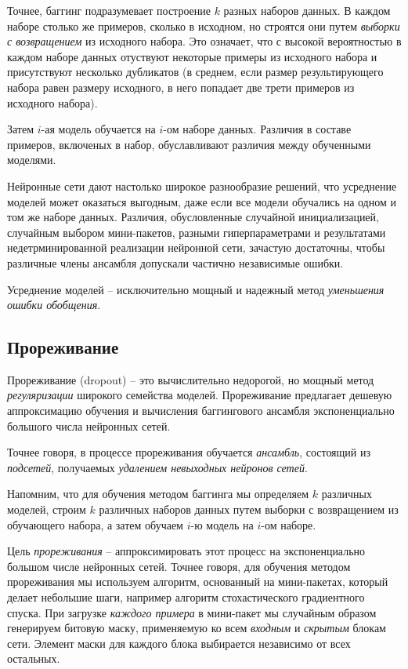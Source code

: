 \documentclass[%
	11pt,
	a4paper,
	utf8,
]{article}
\begin{document}
Точнее, баггинг подразумевает построение $ k $ разных наборов данных. В каждом наборе столько же примеров, сколько в исходном, но строятся они путем \emph{выборки с возвращением} из исходного набора. Это означает, что с высокой вероятностью в каждом наборе данных отуствуют некоторые примеры из исходного набора и присутствуют несколько дубликатов (в среднем, если размер результирующего набора равен размеру исходного, в него попадает две трети примеров из исходного набора). 

Затем $ i $-ая модель обучается на $ i $-ом наборе данных. Различия в составе примеров, включеных в набор, обуславливают различия между обученными моделями.

{\color{blue}Нейронные сети дают настолько широкое разнообразие решений, что усреднение моделей может оказаться выгодным, даже если все модели обучались на одном и том же наборе данных.} Различия, обусловленные случайной инициализацией, случайным выбором мини-пакетов, разными гиперпараметрами и результатами недетрминированной реализации нейронной сети, зачастую достаточны, чтобы различные члены ансамбля допускали частично независимые ошибки.

Усреднение моделей -- исключительно мощный и надежный метод \emph{уменьшения ошибки обобщения}.

\subsection{Прореживание}

Прореживание (dropout) -- это вычислительно недорогой, но мощный метод \emph{регуляризации} широкого семейства моделей. Прореживание предлагает дешевую аппроксимацию обучения и вычисления баггингового ансамбля экспоненциально большого числа нейронных сетей.

Точнее говоря, в процессе прореживания обучается \emph{ансамбль}, состоящий из \emph{подсетей}, получаемых \emph{удалением невыходных нейронов сетей}.

Напомним, что для обучения методом баггинга мы определяем $ k $ различных моделей, строим $ k $ различных наборов данных путем выборки с возвращением из обучающего набора, а затем обучаем $ i $-ю модель на $ i $-ом наборе.

Цель \emph{прореживания} -- аппроксимировать этот процесс на экспоненциально большом числе нейронных сетей. Точнее говоря, для обучения методом прореживания мы используем алгоритм, основанный на мини-пакетах, который делает небольшие шаги, например алгоритм стохастического градиентного спуска. При загрузке \emph{каждого примера} в мини-пакет мы случайным образом генерируем битовую маску, применяемую ко всем \emph{входным} и \emph{скрытым} блокам сети. Элемент маски для каждого блока выбирается независимо от всех остальных.
\end{document}
